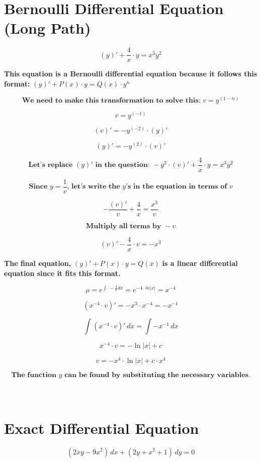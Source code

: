 \documentclass{article}
\begin{document}
\section{Bernoulli Differential Equation (Long Path)}
    \[
    \left(y\right)' + \frac{4}{x} \cdot y = x^3y^2
    \]
    
    \textbf{This equation is a Bernoulli differential equation because it follows this format: } $\left(y\right)' + P(x) \cdot y = Q(x) \cdot y^n$
    
    \[
    \textbf{We need to make this transformation to solve this: } v = y^{(1-n)}
    \]
    
    \[
    v = y^{(-1)}
    \]
    
    \[
    \left(v\right)' = -y^{(-2)} \cdot \left(y\right)'
    \]
    
    \[
    \left(y\right)' = -y^{(2)} \cdot \left(v\right)'
    \]
    
    \[
    \textbf{Let's replace } \left(y\right)' \textbf{ in the question: } -y^2 \cdot (v)' + \frac{4}{x} \cdot y = x^3y^2
    \]
    
    \[
    \textbf{Since } y = \frac{1}{v} \textbf{, let's write the } y \textbf{'s in the equation in terms of } v
    \]
    
    \[
    -\frac{(v)'}{v} + \frac{4}{x} = \frac{x^3}{v}
    \]
    
    \[
    \textbf{Multiply all terms by } -v
    \]
    
    \[
    (v)' - \frac{4}{x} \cdot v = -x^3
    \]
    
    \textbf{The final equation, } $\left(y\right)' + P(x) \cdot y = Q(x)$ \textbf{ is a linear differential equation since it fits this format.}
    
    \[
    \mu =e^{\int \:-\frac{4}{x}dx}=e^{-4\cdot ln\left|x\right|}=x^{-4}
    \]
    
    \[
    \left(x^{-4} \cdot v\right)' = -x^3 \cdot x^{-4} = -x^{-1}
    \]
    
    \[
    \int \left(x^{-4} \cdot v\right)' \, dx = \int -x^{-1} \, dx
    \]
    
    \[
    x^{-4} \cdot v = -\ln|x| + c
    \]
    
    \[
    v = -x^4 \cdot \ln|x| + c \cdot x^4
    \]
    
    \[
    \textbf{The function } y \textbf{ can be found by substituting the necessary variables.}
    \]
\\~\\

\section{Exact Differential Equation}
    \[
    \left(2xy - 9x^2\right) \, dx + \left(2y + x^2 + 1\right) \, dy = 0
    \]
    
\end{document}
